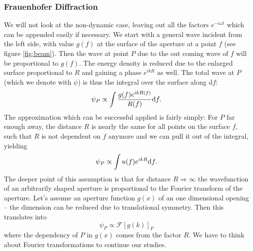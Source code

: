 \subsubsection{Frauenhofer Diffraction} 
We will not look at the non-dynamic case, leaving out all the factors $e^{-i\omega t}$ which can be appended
easily if necessary. We start with a general wave incident from the left side, with value $g(f)$ at the
surface of the aperture at a point $f$ (see figure \ref{fig:beam}). Then the wave at point $P$ due to the
out coming wave of $f$ will
be proportional to $g(f)$. The energy density is reduced due to the enlarged surface proportional to $R$ 
and gaining a phase $e^{ikR}$ as well. 
The total wave at $P$ (which we denote with $\psi$) is thus the integral over the surface along d$f$: 
\begin{equation}
    \label{eq:int1}
    \psi_P \propto \int \frac{g(f) e^{ikR(f)}}{R(f)}\mathrm{d} f.
\end{equation}
The approximation which can be successful applied is fairly simply: For $P$ far enough away, the distance
$R$ is nearly the same for all points on the surface $f$, such that $R$ is not dependent on $f$ anymore and
we can pull it out of the integral, yielding
\begin{equation}
    \label{eq:int1}
    \psi_P \propto \int u(f) e^{ikR}\mathrm{d} f.
\end{equation}
The deeper point of this assumption is that for distance $R \Rightarrow \infty$ the wavefunction
of an arbitrarily shaped aperture is proportional to the Fourier transform of the aperture.
Let's assume an aperture function $g(x)$ of an one dimensional opening -- the dimension can be reduced 
due to translational symmetry. Then this translates into
\begin{equation}
    \psi_P \propto \mathcal{F} \left[g(k)\right ]_P
\end{equation}
where the dependency of $P$ in $g(x)$ comes from the factor $R$.
We have to think about Fourier transformations to continue our studies.

